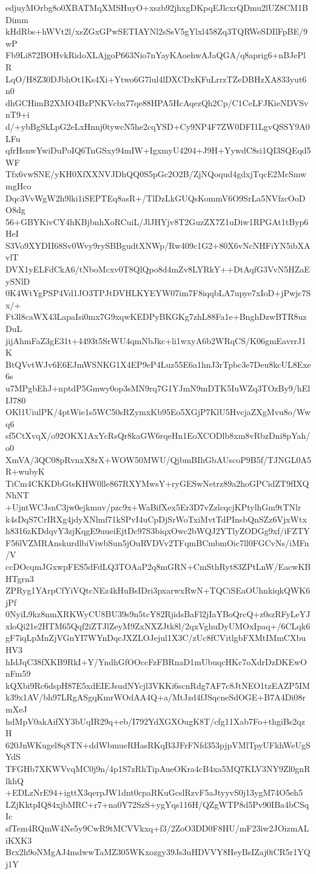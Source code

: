 edjuyMOrbg8o0XBATMqXMSHuyO+xszb92jhxgDKpqEJlcxrQDmu2lUZ8CM1BDimm
kHdRbs+hWVt2l/xsZGxGPwSETIAYNl2sSsV5gYlxl458Zq3TQRWeSDIlFpBE/9wP
Fb9Li872BOHvkRidoXLAjgoP663Nio7nYayKAoehwAJaQGA/q8aprig6+nBJePlR
LqO/H8Z30DJbhOt1Ks4Xi+Ytwo6G7lul4lDXCDxKFuLrrzTZeDBHzXA833yut6n0
dhGCHimB2XMO4BzPNKVcbx77qe88HPA5HcAqezQh2Cp/C1CeLFJKieNDVSvnT9+i
d/+ybBgSkLpG2eLxHnnj0tywcN5he2cqYSD+Cy9NP4F7ZW0DFI1LgvQSSY9A0LFu
qfrHsnwYwiDuPoIQ6TnGSxy94mIW+IgxmyU4204+J9H+YywdC8si1QI3SQEqd5WF
Tfx6vwSNE/yKH0XfXXNVJDhQQ0S5pGc2O2B/ZjNQoqud4gdxjTqcE2McSmwmgHco
Dqc3VvWgW2h9lki1iSEPTEq8asR+/TlDzLkGUQsKommV6O9SrLa5NVfzcOoDO8dg
56+GBYKivCY4hKBjbnhXoRCuiL/JlJHYjv8T2GuzZX7Z1uDiw1RPGAt1tByp6HeI
S3Vo9XYDII68Sv0Wvy9rySBBgudtXNWp/Rw409c1G2+80X6vNcNHFiYN5ibXAvlT
DVX1yELFdCkA6/tNboMcxv0T8QlQpo8d4mZv8LYRkY++DtAqfG3VvN5HZaEySNlD
0K4WtYgPSP4Vd1JO3TPJtDVHLKYEYW07im7F8iqqbLA7upye7xIoD+jPwjc7Sx/+
Ft3l8caWX43LapaIsi0mx7G9xqwKEDPyBKGKg7zhL88Fa1e+BnghDzwBTR8uzDuL
jijAhmFaZ3gE31t+4493t5SrWU4qmNbJkc+li1wxyA6b2WRqCS/K06gmEavrrJ1K
BtQVvtWJv6E6EJmWSNKG1X4EP9eP4Luz55E6a1hnJ3rTpbc3e7Deu8kcUL8Exe6s
u7MPgbEhJ+nptdP5Gmwy0op3sMN9rq7G1YJmN9mDTK5IuWZq3TOzBy9/hElIJ780
OKl1UiulPK/4ptWie1s5WC50sRZymxKb95Eo5XGjP7KlU5HvcjaZXgMvu8o/Wwq6
sf5CtXvqX/o92OKX1AxYcRsQr8kaGW6rqeHn1EoXCODlb8xm8vRbzDni8pYah/o0
XmVA/3QC08pRvnxX8rX+WOW50MWU/QjbmBIhGbAUscoP9B5f/TJNGL0A5R+wubyK
TiCm4CKKDbGtsKHW0lle867RXYMwsY+ryGESwNetrz89a2hoGPCidZT9fIXQNhNT
+UjntWCJsnC3jw0ejkmuv/pzc9x+WaBifXex5Er3D7vZzlcqcjKPtylhGm9tTNlr
k4sDqS7CrIRXg4jdyXNlmf71kSPvI4uCpDjSrWoTxiMvtTdPInsbQnSZz6VjxWtx
h8316zKDdqvY3zjKqgE9uueiEjtDc97S3biqxOwc2bWQJ2YTlyZODGg9xf/iFZTY
F56lVZMRAnskurdlbiViwbSun5jOuRVDVv2TFqmBCmbmOic7ll0FGCvNs/iMFn/V
ccDOcqmJGxwpFES5dFdLQ3TOAaP2q8mGRN+CmSthRyt83ZPtLnW/EacwKBHTgrn3
ZPRyg1YArpCfYiVQtcNEz4kHuBsIDri3pxarwxRwN+TQCiSEaOUhnkiqkQWK6jPf
0NyiL9kz8nmXRKWyCU8BU39s9n5tcY82RjidsBaFl2jIaYBoQrcQ+z0szRFyLeYJ
xloQi21e2HTM65Qqf2iZTJlZeyM9ZxNXZJtk8l/2qxVghuDyUMOxIpaq+/6CLqk6
gF7iqLpMnZjVGnYI7WYnDqcJXZLOJejul1X3C/zUc8fCVitlgbFXMtIMmCXbuHV3
hIdJqC38fXKB9RkI+Y/YndhGfOOccFzFBRnaD1mUbuqcHKc7oXdrDzDKEwOnFm59
kQXbi9Rc6dspH87E5xdEIEJsudNYcjl3VKKi6scnRdg7AF7c8JtNEO1tzEAZP5IM
k39x1AV/bh97LRgASgqKmrWOdAA4Q+a/MtJzd4fJSqcneSdOGE+B7A4Di08rmXeJ
hdMpV0akAifXY3bUqIR29q+eb/I792YdXGXOugK8T/cfg11Xab7Fo+thgiBs2qzH
620JnWKugel8q8TN+ddWbmueRHasRKqB3JFrFNfd353pjpVMlTpyUFkhWeUgSYdS
TFGHb7XKWVvqMC0j9n/4p1S7zRhTipAueOKra4cB4xa5MQ7KLV3NY9Zl0gnRlkhQ
+EDLzNrE94+igttX3qerpJW1dnt0cpaRKuGcslRzvF5aJtyyvS0j13ygM74O5eh5
LZjKktpIQ84xjbMRC+r7+na0Y72SzS+ygYqs116H/QZgWTP8d5Pv90IBa4bCSqIc
sfTem4RQmW4Ne5y9CwR9tMCVVkxq+f3/2ZoO3DD0F8HU/mF23iw2JOizmALiKXK3
Brx2h9oNMgAJ4mdwwTaMZ305WKxozgy39Js3uHDVVY8HeyBsIZaj0iCR5r1YQj1Y
